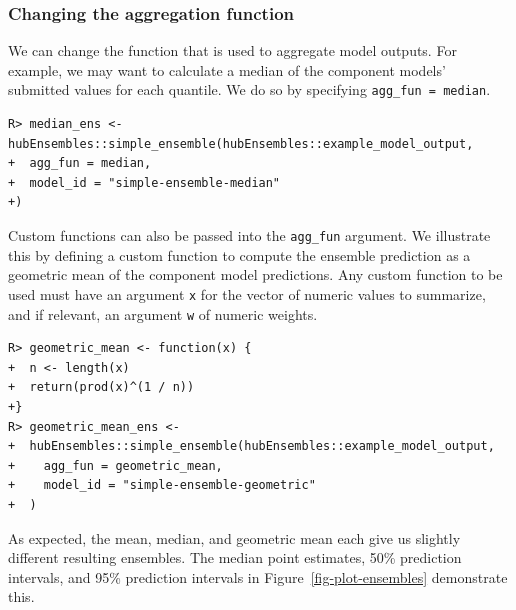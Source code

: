 \documentclass[
  article,
  shortnames,
  notitle]{jss}
\begin{document}
\begin{longtable}[]
\caption{\label{tbl-mean-ensemble}Mean ensemble model output. The values
in the model\_id column are determined by
\texttt{simple\_ensemble(...,\ model\_id\ =\ )} argument). A subset of
ensemble model output is shown: 1-week ahead pmf forecasts made on
2022-12-17 for the US. Results are generated for all output types. Here,
we show only the median, 50\% prediction intervals, and 95\% prediction
intervals for the quantile output type and all bins for the pmf output
type. The \texttt{location}, \texttt{reference\_date} and
\texttt{target\_end\_date} columns have been omitted for brevity, and
the \texttt{value} column is rounded to two digits.}

\tabularnewline
\end{longtable}

\subsubsection{Changing the aggregation
function}\label{changing-the-aggregation-function}

We can change the function that is used to aggregate model outputs. For
example, we may want to calculate a median of the component models'
submitted values for each quantile. We do so by specifying
\texttt{agg\_fun\ =\ median}.

\begin{verbatim}
R> median_ens <- hubEnsembles::simple_ensemble(hubEnsembles::example_model_output,
+  agg_fun = median,
+  model_id = "simple-ensemble-median"
+)
\end{verbatim}

Custom functions can also be passed into the \texttt{agg\_fun} argument.
We illustrate this by defining a custom function to compute the ensemble
prediction as a geometric mean of the component model predictions. Any
custom function to be used must have an argument \texttt{x} for the
vector of numeric values to summarize, and if relevant, an argument
\texttt{w} of numeric weights.

\begin{verbatim}
R> geometric_mean <- function(x) {
+  n <- length(x)
+  return(prod(x)^(1 / n))
+}
R> geometric_mean_ens <-
+  hubEnsembles::simple_ensemble(hubEnsembles::example_model_output,
+    agg_fun = geometric_mean,
+    model_id = "simple-ensemble-geometric"
+  )
\end{verbatim}

As expected, the mean, median, and geometric mean each give us slightly
different resulting ensembles. The median point estimates, 50\%
prediction intervals, and 95\% prediction intervals in
Figure~\ref{fig-plot-ensembles} demonstrate this.
\end{document}
